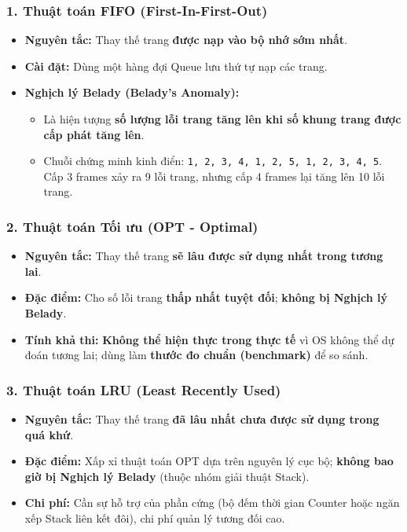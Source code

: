 \documentclass[11pt,a4paper]{article}
\begin{document}
\subsubsection{1. Thuật toán FIFO (First-In-First-Out)}
\begin{itemize}
    \item \textbf{Nguyên tắc:} Thay thế trang \textbf{được nạp vào bộ nhớ sớm nhất}.
    \item \textbf{Cài đặt:} Dùng một hàng đợi Queue lưu thứ tự nạp các trang.
    \item \textbf{Nghịch lý Belady (Belady's Anomaly):} 
    \begin{itemize}[noitemsep]
        \item Là hiện tượng \textbf{số lượng lỗi trang tăng lên khi số khung trang được cấp phát tăng lên}.
        \item Chuỗi chứng minh kinh điển: \texttt{1, 2, 3, 4, 1, 2, 5, 1, 2, 3, 4, 5}. Cấp 3 frames xảy ra 9 lỗi trang, nhưng cấp 4 frames lại tăng lên 10 lỗi trang.
    \end{itemize}
\end{itemize}

\subsubsection{2. Thuật toán Tối ưu (OPT - Optimal)}
\begin{itemize}
    \item \textbf{Nguyên tắc:} Thay thế trang \textbf{sẽ lâu được sử dụng nhất trong tương lai}.
    \item \textbf{Đặc điểm:} Cho số lỗi trang \textbf{thấp nhất tuyệt đối}; \textbf{không bị Nghịch lý Belady}.
    \item \textbf{Tính khả thi:} \textbf{Không thể hiện thực trong thực tế} vì OS không thể dự đoán tương lai; dùng làm \textbf{thước đo chuẩn (benchmark)} để so sánh.
\end{itemize}

\subsubsection{3. Thuật toán LRU (Least Recently Used)}
\begin{itemize}
    \item \textbf{Nguyên tắc:} Thay thế trang \textbf{đã lâu nhất chưa được sử dụng trong quá khứ}.
    \item \textbf{Đặc điểm:} Xấp xỉ thuật toán OPT dựa trên nguyên lý cục bộ; \textbf{không bao giờ bị Nghịch lý Belady} (thuộc nhóm giải thuật Stack).
    \item \textbf{Chi phí:} Cần sự hỗ trợ của phần cứng (bộ đếm thời gian Counter hoặc ngăn xếp Stack liên kết đôi), chi phí quản lý tương đối cao.
\end{itemize}
\end{document}
